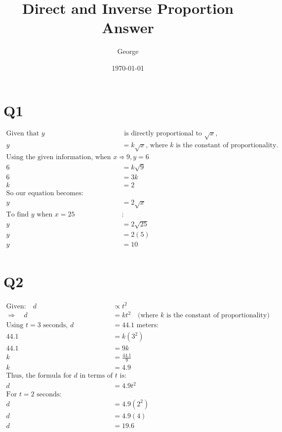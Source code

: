 \documentclass{article}
\title{Direct and Inverse Proportion Answer}
\author{George}
\date{\today}
\begin{document}
\maketitle

\section*{Q1}

\begin{align*}
    \text{Given that } y & \text{ is directly proportional to } \sqrt{x}, \\
    y & = k \sqrt{x} \text{, where } k \text{ is the constant of proportionality.} \\
    \text{Using the given information, when } x = 9, y = 6 & : \\
    6 & = k \sqrt{9} \\
    6 & = 3k \\
    k & = 2 \\
    \text{So our equation becomes:} \\
    y & = 2\sqrt{x} \\
    \text{To find } y \text{ when } x = 25 & : \\
    y & = 2\sqrt{25} \\
    y & = 2(5) \\
    y & = 10 \\
    \end{align*}
    

\section*{Q2}

\begin{align*}
    \text{Given:} \quad d & \propto t^2 \\
    \Rightarrow \quad d & = k t^2 \quad \text{(where } k \text{ is the constant of proportionality)} \\
    \text{Using } t = 3 \text{ seconds, } d & = 44.1 \text{ meters:} \\
    44.1 & = k (3^2) \\
    44.1 & = 9k \\
    k & = \frac{44.1}{9} \\
    k & = 4.9 \\
    \text{Thus, the formula for } d \text{ in terms of } t \text{ is:} \\
    d & = 4.9t^2 \\
    \text{For } t = 2 \text{ seconds:} \\
    d & = 4.9(2^2) \\
    d & = 4.9(4) \\
    d & = 19.6 \\
    \end{align*}
    
\end{document}
